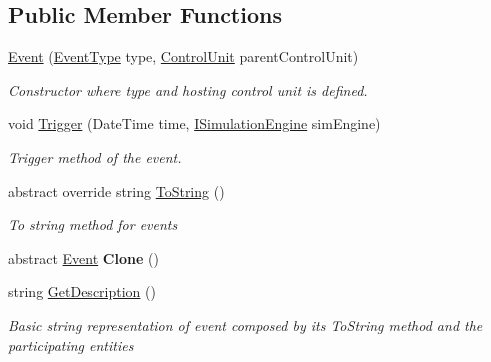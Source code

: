 \subsection*{Public Member Functions}
\begin{DoxyCompactItemize}
\item 
\hyperlink{class_simulation_core_1_1_h_c_c_m_elements_1_1_event_a77647384fb28ba854eadae69819d317c}{Event} (\hyperlink{namespace_simulation_core_1_1_h_c_c_m_elements_a669ec0bd71214ac647777c49eb962e13}{Event\+Type} type, \hyperlink{class_simulation_core_1_1_h_c_c_m_elements_1_1_control_unit}{Control\+Unit} parent\+Control\+Unit)
\begin{DoxyCompactList}\small\item\em Constructor where type and hosting control unit is defined. \end{DoxyCompactList}\item 
void \hyperlink{class_simulation_core_1_1_h_c_c_m_elements_1_1_event_a3ebf1b80ea767c6276b97dda5ed04a49}{Trigger} (Date\+Time time, \hyperlink{interface_simulation_core_1_1_simulation_classes_1_1_i_simulation_engine}{I\+Simulation\+Engine} sim\+Engine)
\begin{DoxyCompactList}\small\item\em Trigger method of the event. \end{DoxyCompactList}\item 
abstract override string \hyperlink{class_simulation_core_1_1_h_c_c_m_elements_1_1_event_a74668b01e4c7898939a3d98d6ee3a780}{To\+String} ()
\begin{DoxyCompactList}\small\item\em To string method for events \end{DoxyCompactList}\item 
abstract \hyperlink{class_simulation_core_1_1_h_c_c_m_elements_1_1_event}{Event} {\bfseries Clone} ()\hypertarget{class_simulation_core_1_1_h_c_c_m_elements_1_1_event_ac9fa3e7bd2b59e89352f3fff03516788}{}\label{class_simulation_core_1_1_h_c_c_m_elements_1_1_event_ac9fa3e7bd2b59e89352f3fff03516788}

\item 
string \hyperlink{class_simulation_core_1_1_h_c_c_m_elements_1_1_event_adf6152d9ef4336b8d46da6cabe992f05}{Get\+Description} ()
\begin{DoxyCompactList}\small\item\em Basic string representation of event composed by its To\+String method and the participating entities \end{DoxyCompactList}\end{DoxyCompactItemize}
